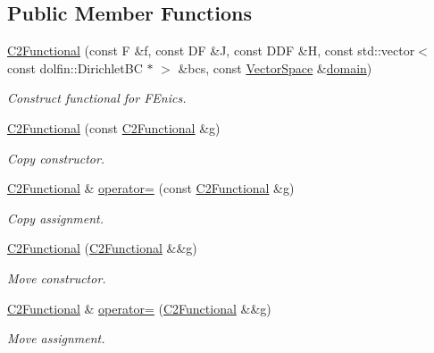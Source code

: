\subsection*{Public Member Functions}
\begin{DoxyCompactItemize}
\item 
\hyperlink{classSpacy_1_1FEniCS_1_1C2Functional_a8f32c233a72dc3d25a656c1db12af943}{C2\+Functional} (const F \&f, const D\+F \&J, const D\+D\+F \&H, const std\+::vector$<$ const dolfin\+::\+Dirichlet\+B\+C $\ast$ $>$ \&bcs, const \hyperlink{classSpacy_1_1VectorSpace}{Vector\+Space} \&\hyperlink{classSpacy_1_1FunctionalBase_a2d3397deb9fa1ad85ed04e37a03b3aa6}{domain})
\begin{DoxyCompactList}\small\item\em Construct functional for F\+Enics. \end{DoxyCompactList}\item 
\hyperlink{classSpacy_1_1FEniCS_1_1C2Functional_addb84a06f7f82969c57e5bf1b65f2b68}{C2\+Functional} (const \hyperlink{classSpacy_1_1FEniCS_1_1C2Functional}{C2\+Functional} \&g)
\begin{DoxyCompactList}\small\item\em Copy constructor. \end{DoxyCompactList}\item 
\hyperlink{classSpacy_1_1FEniCS_1_1C2Functional}{C2\+Functional} \& \hyperlink{classSpacy_1_1FEniCS_1_1C2Functional_ab9ff23de1e812f6782b7db6ec01e0f4c}{operator=} (const \hyperlink{classSpacy_1_1FEniCS_1_1C2Functional}{C2\+Functional} \&g)
\begin{DoxyCompactList}\small\item\em Copy assignment. \end{DoxyCompactList}\item 
\hyperlink{classSpacy_1_1FEniCS_1_1C2Functional_af9ac63335fc062d18e08fa186312b5a2}{C2\+Functional} (\hyperlink{classSpacy_1_1FEniCS_1_1C2Functional}{C2\+Functional} \&\&g)
\begin{DoxyCompactList}\small\item\em Move constructor. \end{DoxyCompactList}\item 
\hyperlink{classSpacy_1_1FEniCS_1_1C2Functional}{C2\+Functional} \& \hyperlink{classSpacy_1_1FEniCS_1_1C2Functional_a96a909732f7f098d67ee5eba20406337}{operator=} (\hyperlink{classSpacy_1_1FEniCS_1_1C2Functional}{C2\+Functional} \&\&g)
\begin{DoxyCompactList}\small\item\em Move assignment. \end{DoxyCompactList}\item 

\end{DoxyCompactItemize}
